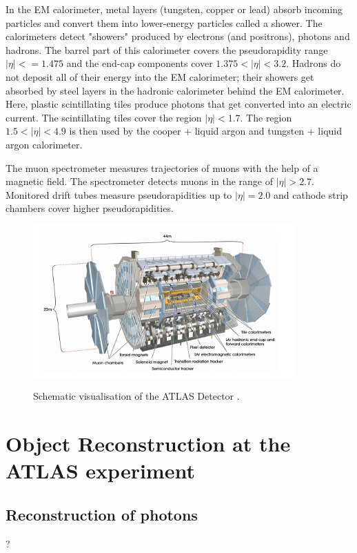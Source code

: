 In the EM calorimeter, metal layers (tungsten, copper or lead) absorb incoming particles and convert them into lower-energy particles called a shower. The calorimeters detect "showers" produced by electrons (and positrons), photons and hadrons. The barrel part of this calorimeter covers the pseudorapidity range $|\eta| < = 1.475$ and the end-cap components cover $1.375 <|\eta|< 3.2$.
Hadrons do not deposit all of their energy into the EM calorimeter; their showers get absorbed by steel layers in the hadronic calorimeter behind the EM calorimeter. 
Here, plastic scintillating tiles produce photons that get converted into an electric current. The scintillating tiles cover the region $|\eta| < 1.7$. The region $1.5 < |\eta| < 4.9$ is then used by the cooper + liquid argon and tungsten + liquid argon calorimeter.

The muon spectrometer measures trajectories of muons with the help of a magnetic field. The spectrometer detects muons in the range of $\bigl|\eta\bigr| > 2.7$. 
Monitored drift tubes measure pseudorapidities up to $|\eta| = 2.0$ and cathode strip chambers cover higher pseudorapidities.  
\begin{figure}
    \centering
    \includegraphics[width=0.9\textwidth]{Plots/atlasSCHEMA.PNG}
    \label{fig:atlasschema}
    \caption{Schematic visualisation of the ATLAS Detector \cite{Collaboration_2008}.}
\end{figure}



\section{Object Reconstruction at the ATLAS experiment}

\subsection{Reconstruction of photons}
\label{sec:reconphoton}
?
